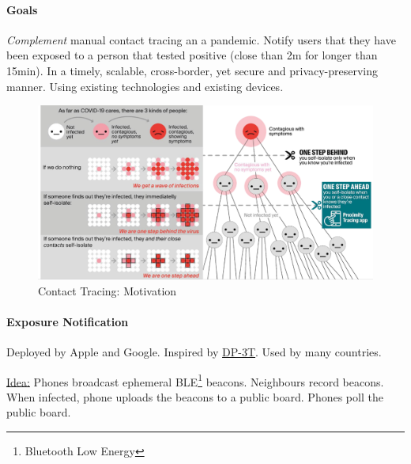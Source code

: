 \paragraph{Goals}
\textit{Complement} manual contact tracing an a pandemic.
Notify users that they have been exposed to a person that tested positive (close than 2m for longer than 15min).
In a timely, scalable, cross-border, yet secure and privacy-preserving manner.
Using existing technologies and existing devices.

\begin{figure}[h]
	\centering
	\includegraphics[scale=0.25]{images/11-why-tracing.png}
	\caption{Contact Tracing: Motivation}
	\label{fig:why-tracing}
\end{figure}

\paragraph{Exposure Notification}
Deployed by Apple and Google. Inspired by
\href{https://github.com/DP-3T/documents}{DP-3T}. Used by many countries.

\underline{Idea:}
Phones broadcast ephemeral BLE\footnote{Bluetooth Low Energy} beacons.
Neighbours record beacons.
When infected, phone uploads the beacons to a public board.
Phones poll the public board.

